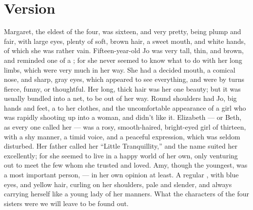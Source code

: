 \documentclass{fiche}
\begin{document}

\newpage
\section{Version}

\begin{version}
Margaret, the eldest of the four, was sixteen, and very pretty, being plump and fair, with
large eyes, plenty of soft, brown hair, a sweet mouth, and white hands, of which she was
rather vain. Fifteen-year-old Jo was very tall, thin, and brown, and reminded one of a
; for she never seemed to know what to do with her long limbs,
which were very much in her way. She had a decided mouth, a comical nose, and sharp, gray
eyes, which appeared to see everything, and were by turns fierce, funny, or thoughtful. Her
long, thick hair was her one beauty; but it was usually bundled into a net, to be out of her
way. Round shoulders had Jo, big hands and feet, a  to her clothes, and the uncomfortable appearance of a girl who was rapidly
shooting up into a woman, and didn't like it. Elizabeth --- or Beth, as every one called her
--- was a rosy, smooth-haired, bright-eyed girl of thirteen, with a shy manner, a timid
voice, and a peaceful expression, which was seldom disturbed. Her father called her ``Little
Tranquillity,'' and the name suited her excellently; for she seemed to live in a happy world
of her own, only venturing out to meet the few whom she trusted and loved. Amy, though the
youngest, was a most important person, --- in her own opinion at least. A regular
, with blue eyes, and yellow hair, curling
on her shoulders, pale and slender, and always carrying herself like a young lady
 of her manners. What the characters of the four sisters
were we will leave to be found out.
\end{version}
\end{document}
